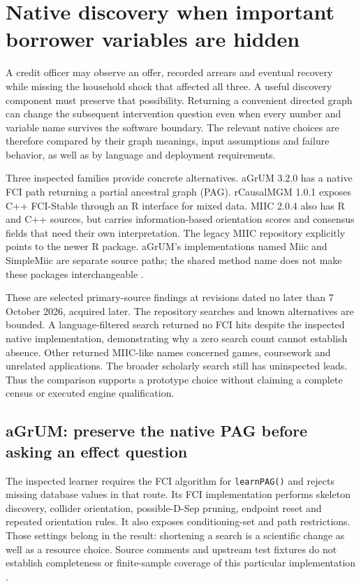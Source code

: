 \section{Native discovery when important borrower variables are hidden}
\label{exec14:cxx-latent}

A credit officer may observe an offer, recorded arrears and eventual recovery
while missing the household shock that affected all three. A useful discovery
component must preserve that possibility. Returning a convenient directed
graph can change the subsequent intervention question even when every number
and variable name survives the software boundary. The relevant native choices
are therefore compared by their graph meanings, input assumptions and failure
behavior, as well as by language and deployment requirements.

Three inspected families provide concrete alternatives. aGrUM 3.2.0 has a
native FCI path returning a partial ancestral graph (PAG). rCausalMGM 1.0.1
exposes C++ FCI-Stable through an R interface for mixed data. MIIC 2.0.4 also
has R and C++ sources, but carries information-based orientation scores and
consensus fields that need their own interpretation. The legacy MIIC repository
explicitly points to the newer R package. aGrUM's implementations named Miic
and SimpleMiic are separate source paths; the shared method name does not make
these packages interchangeable
\citep{exec14_native_agrum,exec14_native_rcmgm,exec14_native_miic}.

These are selected primary-source findings at revisions dated no later than
7 October 2026, acquired later. The repository searches and known alternatives
are bounded. A language-filtered search returned no FCI hits despite the
inspected native implementation, demonstrating why a zero search count cannot
establish absence. Other returned MIIC-like names concerned games, coursework
and unrelated applications. The broader scholarly search still has
uninspected leads. Thus the comparison supports a prototype choice without
claiming a complete census or executed engine qualification.

\subsection{aGrUM: preserve the native PAG before asking an effect question}

The inspected learner requires the FCI algorithm for \texttt{learnPAG()} and
rejects missing database values in that route. Its FCI implementation performs
skeleton discovery, collider orientation, possible-D-Sep pruning, endpoint
reset and repeated orientation rules. It also exposes conditioning-set and
path restrictions. Those settings belong in the result: shortening a search
is a scientific change as well as a resource choice. Source comments and
upstream test fixtures do not establish completeness or finite-sample coverage
of this particular implementation \citep{exec14_native_agrum}.

